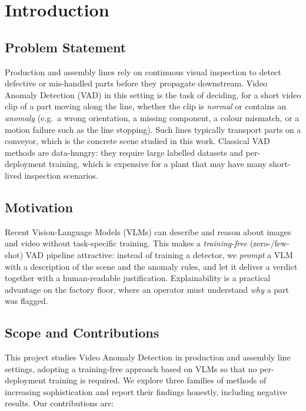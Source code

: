 \chapter{Introduction}

\section{Problem Statement}
Production and assembly lines rely on continuous visual inspection to detect defective
or mis-handled parts before they propagate downstream. Video Anomaly Detection (VAD) in
this setting is the task of deciding, for a short video clip of a part moving along the
line, whether the clip is \emph{normal} or contains an \emph{anomaly} (e.g.\ a wrong
orientation, a missing component, a colour mismatch, or a motion failure such as the line
stopping). Such lines typically transport parts on a conveyor, which is the concrete
scene studied in this work. Classical VAD methods are data-hungry: they require large
labelled datasets and per-deployment training, which is expensive for a plant that may
have many short-lived inspection scenarios.

\section{Motivation}
Recent Vision-Language Models (VLMs) can describe and reason about images and video
without task-specific training. This makes a \emph{training-free} (zero-/few-shot) VAD
pipeline attractive: instead of training a detector, we \emph{prompt} a VLM with a
description of the scene and the anomaly rules, and let it deliver a verdict together
with a human-readable justification. Explainability is a practical advantage on the
factory floor, where an operator must understand \emph{why} a part was flagged.

\section{Scope and Contributions}
This project studies Video Anomaly Detection in production and assembly line settings,
adopting a training-free approach based on VLMs so that no per-deployment training is
required. We explore three families of methods of increasing sophistication and report
their findings honestly, including negative results. Our contributions are:


